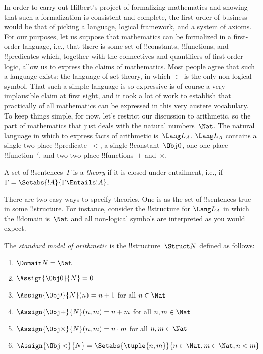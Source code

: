 \documentclass[../../../include/open-logic-section]{subfiles}
\begin{document}

In order to carry out Hilbert's project of formalizing mathematics and
showing that such a formalization is consistent and complete, the
first order of business would be that of picking a language, logical
framework, and a system of axioms.  For our purposes, let us suppose
that mathematics can be formalized in a first-order language, i.e.,
that there is some set of !!{constant}s, !!{function}s, and
!!{predicate}s which, together with the connectives and quantifiers of
first-order logic, allow us to express the claims of mathematics.
Most people agree that such a language exists: the language of set
theory, in which $\in$ is the only non-logical symbol.  That such a
simple language is so expressive is of course a very implausible claim
at first sight, and it took a lot of work to establish that
practically of all mathematics can be expressed in this very austere
vocabulary.  To keep things simple, for now, let's restrict our
discussion to arithmetic, so the part of mathematics that just deals
with the natural numbers~$\Nat$.  The natural language in which to
express facts of arithmetic is~$\Lang L_A$. $\Lang L_A$ contains a
single two-place !!{predicate}~$<$, a single !!{constant}~$\Obj 0$,
one one-place !!{function}~$\prime$, and two two-place
!!{function}s~$+$ and~$\times$.

\begin{defn}
A set of !!{sentence}s~$\Gamma$ is a \emph{theory} if it is closed
under entailment, i.e., if $\Gamma = \Setabs{!A}{\Gamma \Entails
!A}$.
\end{defn}

There are two easy ways to specify theories. One is as the set of
!!{sentence}s true in some !!{structure}.  For instance, consider the
!!{structure} for $\Lang L_A$ in which the !!{domain} is~$\Nat$ and
all non-logical symbols are interpreted as you would expect.

\begin{defn}
The \emph{standard model of arithmetic} is the !!{structure}~$\Struct
N$ defined as follows:
\begin{enumerate}
\item $\Domain N = \Nat$
\item $\Assign{\Obj 0}{N} = 0$
\item $\Assign{\Obj \prime}{N}(n) = n + 1$ for all $n \in \Nat$
\item $\Assign{\Obj +}{N}(n, m) = n + m$ for all $n, m \in \Nat$
\item $\Assign{\Obj \times}{N}(n, m) = n\cdot m$ for all $n, m \in \Nat$
\item $\Assign{\Obj <}{N} = \Setabs{\tuple{n, m}}{n \in \Nat, m \in
  \Nat, n < m}$
\end{enumerate}
\end{defn}
\end{document}
